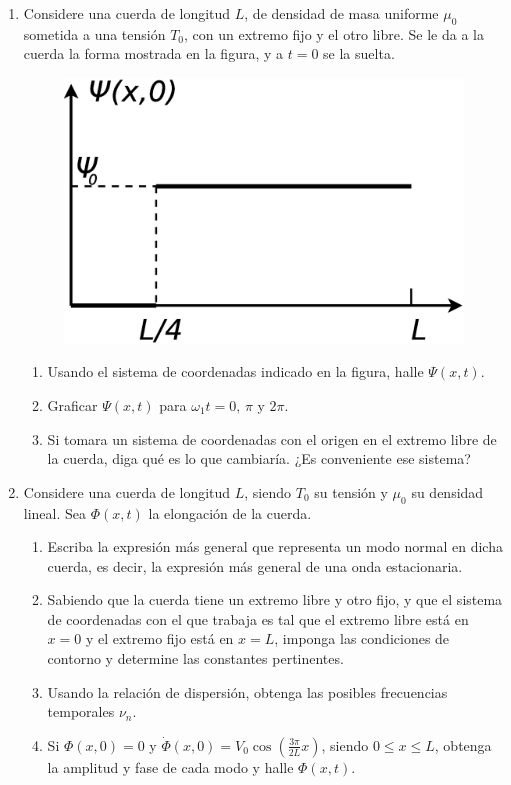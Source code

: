 \documentclass[11pt,spanish,a4paper]{article}
\begin{document}
\begin{enumerate}
\item Considere una cuerda de longitud $L$, de densidad de masa uniforme
$\mu_{0}$ sometida a una tensión $T_{0}$, con un extremo fijo y
el otro libre. Se le da a la cuerda la forma mostrada en la figura,
y a $t=0$ se la suelta.
\begin{figure}[H]
\centering{}\includegraphics[clip,scale=0.25]{ej1-25}
\end{figure}
\begin{enumerate}
	\item Usando el sistema de coordenadas indicado en la figura, halle $\Psi(x,t)$.
	\item Graficar $\Psi(x,t)$ para $\omega_{1}t=0,\,\pi$ y $2\pi$.
	\item Si tomara un sistema de coordenadas con el origen en el extremo libre
de la cuerda, diga qué es lo que cambiaría. ¿Es conveniente ese sistema?
\end{enumerate}


\item Considere una cuerda de longitud $L$, siendo $T_{0}$ su tensión
y $\mu_{0}$ su densidad lineal. Sea $\Phi(x,t)$ la elongación de
la cuerda.
\begin{enumerate}
	\item Escriba la expresión más general que representa un modo normal en
dicha cuerda, es decir, la expresión más general de una onda estacionaria.
	\item Sabiendo que la cuerda tiene un extremo libre y otro fijo, y que el
sistema de coordenadas con el que trabaja es tal que el extremo libre
está en $x=0$ y el extremo fijo está en $x=L$, imponga las condiciones
de contorno y determine las constantes pertinentes.
	\item Usando la relación de dispersión, obtenga las posibles frecuencias
temporales $\nu_{n}$. 
	\item Si $\Phi(x,0)=0$ y $\dot{\Phi}(x,0)=V_{0}\cos\left(\frac{3\pi}{2L}x\right)$,
siendo $0\le x\le L$, obtenga la amplitud y fase de cada modo y halle
$\Phi(x,t)$.
\end{enumerate}




\end{enumerate}
\end{document}
